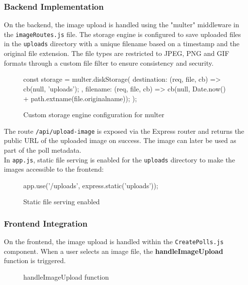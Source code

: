\documentclass[a4paper,12pt]{report}
\begin{document}
\subsubsection{Backend Implementation}
On the backend, the image upload is handled using the "multer" middleware in the \texttt{imageRoutes.js} file. The storage engine is configured to save uploaded files in the \texttt{uploads} directory with a unique filename based on a timestamp and the original file extension. The file types are restricted to JPEG, PNG and GIF formats through a custom file filter to ensure consistency and security. \parencite{expressmulter}
\begin{figure}[H]
	\begin{code}
		const storage = multer.diskStorage({
			destination: (req, file, cb) => {
				cb(null, 'uploads');
			},
			filename: (req, file, cb) => {
				cb(null, Date.now() + path.extname(file.originalname));
			}
		});
	\end{code}
	\caption{Custom storage engine configuration for multer}
	\label{fig:multer_config}
\end{figure}
\noindent
The route \texttt{/api/upload-image} is exposed via the Express router and returns the public URL of the uploaded image on success. The image can later be used as part of the poll metadata.\\
In \texttt{app.js}, static file serving is enabled for the \texttt{uploads} directory to make the images accessible to the frontend:
\begin{figure}[H]
	\begin{code}
		app.use('/uploads', express.static('uploads'));
	\end{code}
	\caption{Static file serving enabled}
	\label{fig:static_file_serving}
\end{figure}
\subsubsection{Frontend Integration}
On the frontend, the image upload is handled within the \texttt{CreatePolls.js} component. When a user selects an image file, the \textbf{handleImageUpload} function is triggered. 
\begin{figure}[H]
	\caption{handleImageUpload function}
	\label{fig:handleImageUpload}
\end{figure}
\noindent
\end{document}
